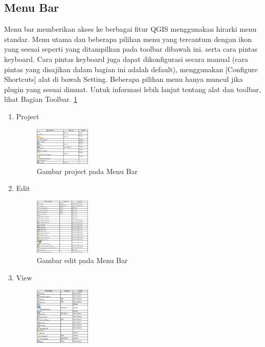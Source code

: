\subsection{Menu Bar}
Menu bar memberikan akses ke berbagai fitur QGIS menggunakan hirarki menu standar. Menu utama dan beberapa pilihan menu yang tercantum dengan ikon yang sesuai seperti yang ditampilkan pada toolbar dibawah ini. serta cara pintas keyboard. Cara pintas keyboard juga dapat dikonfigurasi secara manual (cara pintas yang disajikan dalam bagian ini adalah default), menggunakan [Configure Shortcuts] alat di bawah Setting. Beberapa pilihan menu hanya muncul jika plugin yang sesuai dimuat. Untuk informasi lebih lanjut tentang alat dan toolbar, lihat Bagian Toolbar. \ref{menubar}
\begin{enumerate}
\item
Project
\begin{figure}[ht]
    \centerline{\includegraphics[width=0.25\textwidth]{figures/menubar}}
    \caption{Gambar project pada Menu Bar}
    \label{menubar}
    \end{figure}
\item
Edit
\begin{figure}[ht]
    \centerline{\includegraphics[width=0.25\textwidth]{figures/menubar1}}
    \caption{Gambar edit pada Menu Bar}
    \label{menubar1}
    \end{figure}
\item
View
\begin{figure}[ht]
    \centerline{\includegraphics[width=0.25\textwidth]{figures/menubar2}}

\end{figure}
\end{enumerate}
